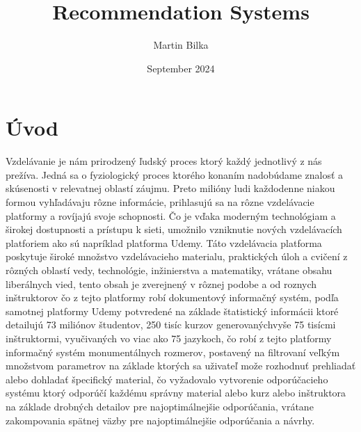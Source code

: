 \documentclass{article}
\title{Recommendation Systems}
\author{Martin Bilka}
\date{September 2024}
\begin{document}
\maketitle

\section{Úvod}

Vzdelávanie je nám prirodzený ľudský proces ktorý každý jednotlivý z nás prežíva. Jedná sa o
fyziologický proces ktorého konaním nadobúdame znalosť a skúsenosti v relevatnej oblastí záujmu.
Preto milióny ludi každodenne niakou formou vyhľadávaju rôzne informácie, prihlasujú sa na rôzne
vzdelávacie platformy a rovíjajú svoje schopnosti. Čo je vďaka moderným technológiam a širokej
dostupnosti a prístupu k sieti, umožnilo vzniknutie nových vzdelávacích platforiem ako sú napríklad
platforma Udemy. Táto vzdelávacia platforma poskytuje široké množstvo vzdelávacieho materialu,
praktických úloh a cvičení z rôzných oblastí vedy, technológie, inžinierstva a matematiky, vrátane
obsahu liberálnych vied, tento obsah je zverejnený v rôznej podobe a od roznych inštruktorov čo z
tejto platformy robí dokumentový informačný systém, podľa samotnej platformy Udemy potvredené
na základe štatistický informácii ktoré detailujú 73 miliónov študentov, 250 tisíc kurzov generovanýchvyše 75 tisícmi inštruktormi, vyučivaných vo viac ako 75 jazykoch, čo robí z tejto platformy informačný systém monumentálnych rozmerov, postavený na filtrovaní veľkým množstvom
parametrov na základe ktorých sa uživateľ može rozhodnuť prehliadať alebo dohladať špecifický
material, čo vyžadovalo vytvorenie odporúčacieho systému ktorý odporúčí každému správny material
alebo kurz alebo inštruktora na základe drobných detailov pre najoptimálnejšie odporúčania, vrátane
zakompovania spätnej väzby pre najoptimálnejšie odporúčania a návrhy.
 
\end{document}
